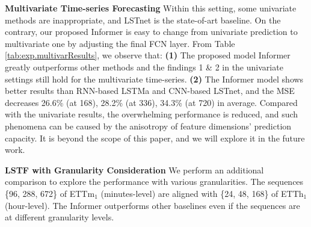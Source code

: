 \documentclass[letterpaper]{article} %
\newcommand{\mn}{Informer}
\begin{document}
\textbf{Multivariate Time-series Forecasting}
Within this setting, some univariate methods are inappropriate, and LSTnet is the state-of-art baseline. On the contrary, our proposed {\mn} is easy to change from univariate prediction to multivariate one by adjusting the final FCN layer.
From Table \ref{tab:exp.multivarResults}, we observe that: \textbf{(1)} The proposed model {\mn} greatly outperforms other methods and the findings 1 \& 2 in the univariate settings still hold for the multivariate time-series.
\textbf{(2)} The {\mn} model shows better results than RNN-based LSTMa and CNN-based LSTnet, and the MSE decreases 26.6\% (at 168), 28.2\% (at 336), 34.3\% (at 720) in average. Compared with the univariate results, the overwhelming performance is reduced, and such phenomena can be caused by the anisotropy of feature dimensions' prediction capacity. It is beyond the scope of this paper, and we will explore it in the future work.


\textbf{LSTF with Granularity Consideration}
We perform an additional comparison to explore the performance with various granularities. The sequences \{96, 288, 672\} of ETTm$_1$ (minutes-level) are aligned with \{24, 48, 168\} of ETTh$_1$ (hour-level). The {\mn} outperforms other baselines even if the sequences are at different granularity levels.
\end{document}
